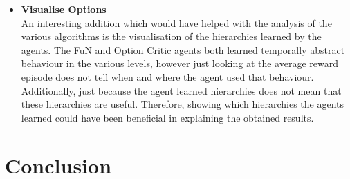 \documentclass[notitlepage,a4paper,11pt]{article}
\begin{document}
\begin{itemize}
	\item
	\textbf{Visualise Options}\\
	An interesting addition which would have helped with the analysis of the various algorithms is the visualisation of the hierarchies learned by the agents. The FuN and Option Critic agents both learned temporally abstract behaviour in the various levels, however just looking at the average reward episode does not tell when and where the agent used that behaviour. Additionally, just because the agent learned hierarchies does not mean that these hierarchies are useful. Therefore, showing which hierarchies the agents learned could have been beneficial in explaining the obtained results.
	
	
\end{itemize}


\section{Conclusion}
\end{document}
